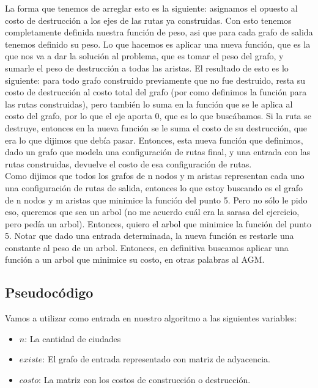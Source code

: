 La forma que tenemos de arreglar esto es la siguiente: asignamos el opuesto al costo de destrucción a los ejes de las rutas ya construidas. Con esto tenemos completamente definida nuestra función de peso, asi que para cada grafo de salida tenemos definido su peso. Lo que hacemos es aplicar una nueva función, que es la que nos va a dar la solución al problema, que es tomar el peso del grafo, y sumarle el peso de destrucción a todas las aristas. El resultado de esto es lo siguiente: para todo grafo construido previamente que no fue destruido, resta su costo de destrucción al costo total del grafo (por como definimos la función para las rutas construidas), pero también lo suma en la función que se le aplica al costo del grafo, por lo que el eje aporta 0, que es lo que buscábamos. Si la ruta se destruye, entonces en la nueva función se le suma el costo de su destrucción, que era lo que dijimos que debía pasar. Entonces, esta nueva función que definimos, dado un grafo que modela una configuración de rutas final, y una entrada con las rutas construidas, devuelve el costo de esa configuración de rutas.  \\

Como dijimos que todos los grafos de n nodos y m aristas representan cada uno una configuración de rutas de salida, entonces lo que estoy buscando es el grafo de n nodos y m aristas que minimice la función del punto 5. Pero no sólo le pido eso, queremos que sea un arbol (no me acuerdo cuál era la sarasa del ejercicio, pero pedía un arbol). Entonces, quiero el arbol que minimice la función del punto 5. Notar que dado una entrada determinada, la nueva función es restarle una constante al peso de un arbol. Entonces, en definitiva buscamos aplicar una función a un arbol que minimice su costo, en otras palabras al AGM. \\

\subsection{Pseudocódigo}

Vamos a utilizar como entrada en nuestro algoritmo a las siguientes variables:
\begin{itemize}
	\item $n$: La cantidad de ciudades
	\item $existe$: El grafo de entrada representado con matriz de adyacencia.
	\item $costo$: La matriz con los costos de construcci\'on o destrucci\'on.
\end{itemize}

